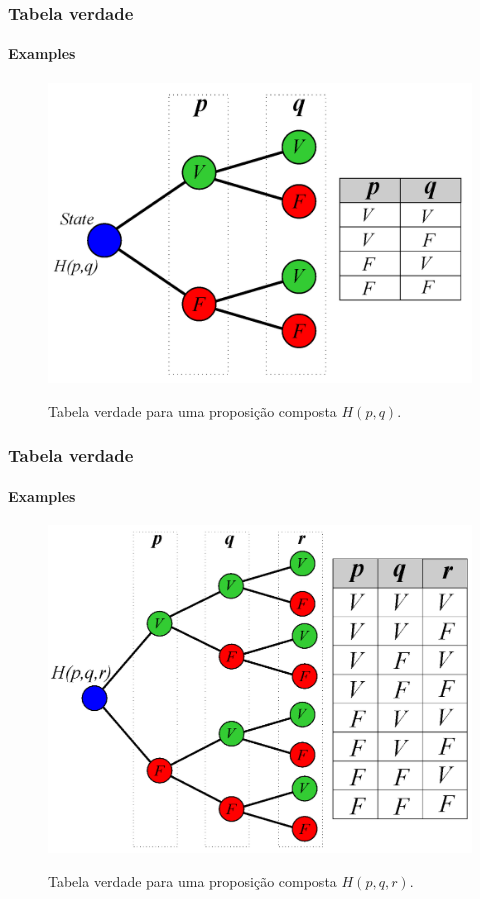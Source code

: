 \documentclass[10pt, headsepline, captions=tableabove,xcolor=table]{beamer}
\begin{document}
\begin{frame}[c]
    \frametitle{Tabela verdade}
    \framesubtitle{Examples}
    \begin{figure}[c]
        \centering
        \caption{Tabela verdade para uma proposição composta $H(p,q)$.}
        \includegraphics[scale=0.30]{TT3.png}
        \label{fig:tabela-verdade2}
    \end{figure}
\end{frame}
%
\begin{frame}[c]
    \frametitle{Tabela verdade}
    \framesubtitle{Examples}
    \begin{figure}[c]
        \centering
        \caption{Tabela verdade para uma proposição composta $H(p,q,r)$.}
        \includegraphics[scale=0.30]{TT4.png}
        \label{fig:tabela-verdade3}
    \end{figure}
\end{frame}
%
\end{document}
